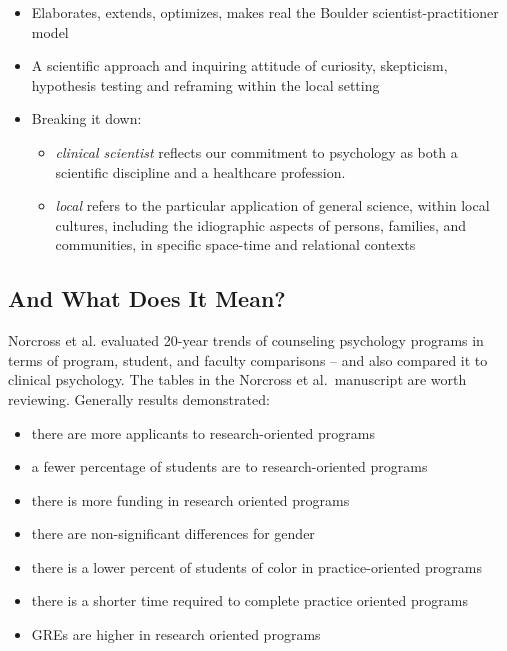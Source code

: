 \documentclass[
  english,
]{book}
\providecommand{\tightlist}{%
  \setlength{\itemsep}{0pt}\setlength{\parskip}{0pt}}
\begin{document}
\begin{itemize}
\tightlist
\item
  Elaborates, extends, optimizes, makes real the Boulder scientist-practitioner model
\item
  A scientific approach and inquiring attitude of curiosity, skepticism, hypothesis testing and reframing within the local setting
\item
  Breaking it down:

  \begin{itemize}
  \tightlist
  \item
    \emph{clinical scientist} reflects our commitment to psychology as both a scientific discipline and a healthcare profession.
  \item
    \emph{local} refers to the particular application of general science, within local cultures, including the idiographic aspects of persons, families, and communities, in specific space-time and relational contexts
  \end{itemize}
\end{itemize}

\hypertarget{and-what-does-it-mean}{%
\subsection{And What Does It Mean?}\label{and-what-does-it-mean}}

Norcross et al.\citeyearpar{norcross_doctoral_2020} evaluated 20-year trends of counseling psychology programs in terms of program, student, and faculty comparisons -- and also compared it to clinical psychology. The tables in the Norcross et al.~manuscript are worth reviewing. Generally results demonstrated:

\begin{itemize}
\tightlist
\item
  there are more applicants to research-oriented programs
\item
  a fewer percentage of students are to research-oriented programs
\item
  there is more funding in research oriented programs
\item
  there are non-significant differences for gender
\item
  there is a lower percent of students of color in practice-oriented programs
\item
  there is a shorter time required to complete practice oriented programs
\item
  GREs are higher in research oriented programs
\end{itemize}
\end{document}
